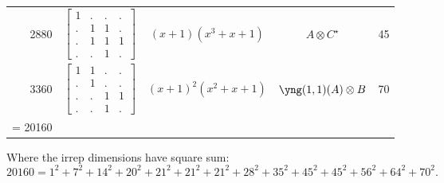 \documentclass[11pt,oneside]{article}
\newcommand{\tensor}{\otimes}
\begin{document}
\begin{center}
\begin{tabular}{r|l|c|c|c}
2880  & $\begin{bmatrix}1&.&.&.\\.&1&1&.\\.&1&1&1\\.&.&1&.\end{bmatrix}$
  & $(x+1)(x^3+x+1)$  & $A\tensor C^{\star}$ & 45   \\
3360  & $\begin{bmatrix}1&1&.&.\\.&1&.&.\\.&.&1&1\\.&.&1&.\end{bmatrix}$  & $(x+1)^2(x^2+x+1)$  & $\yng(1,1)(A)\tensor B$ & 70 \\
\hline
\strut = 20160 \\
\end{tabular}
\end{center}
Where the irrep dimensions have square sum:
$$
 20160 = 1^2 + 7^2 + 14^2 + 20^2 + 21^2 + 21^2 + 21^2 + 28^2 + 35^2 + 45^2 + 45^2 + 56^2 + 64^2 + 70^2.
$$
\end{document}
